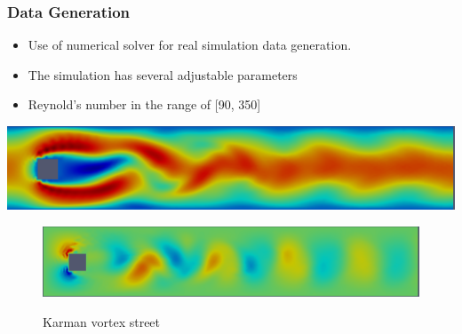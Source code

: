 \documentclass[18pt]{beamer}
\begin{document}
\begin{frame}[t]
  \frametitle{Data Generation}
  \begin{itemize}
  \item Use of numerical solver for real simulation data generation.
  \item The simulation has several adjustable parameters
  \item Reynold's number in the range of [90, 350]
  \end{itemize}
  \begin{center}
    \includegraphics[scale=0.21]{images/x-direction}
  \end{center}
  \begin{center}
    \begin{figure}[htb]
    \includegraphics[scale=0.21]{images/y-direction} \\
    \caption{Karman vortex street}
    \end{figure}
  \end{center}
\end{frame}
\end{document}
